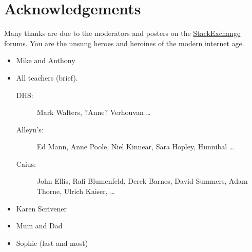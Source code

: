 \chapter*{Acknowledgements}


Many thanks are due to the moderators and posters on the \mbox{\href{http://stackexchange.com/}{StackExchange}} forums. You are the unsung heroes and heroines of the modern internet age.

\begin{itemize}
  \item Mike and Anthony
  \item All teachers (brief). 
    \begin{description}
      \item[DHS:] Mark Walters, ?Anne? Verhouvan \ldots
      \item[Alleyn's:] Ed Mann, Anne Poole, Niel Kinnear, Sara Hopley, Hunnibal \ldots 
      \item[Caius:] John Ellis, Rafi Blumenfeld, Derek Barnes, David Summers, Adam Thorne, Ulrich Kaiser, \ldots
    \end{description}
  \item Karen Scrivener
  \item Mum and Dad
  \item Sophie (last and most)
\end{itemize}

\cleardoublepage{}
